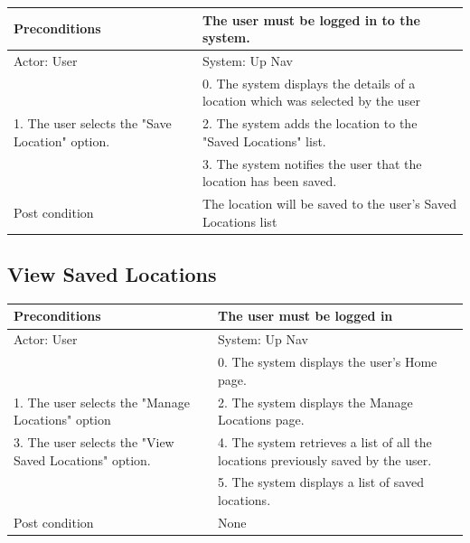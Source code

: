 \documentclass{article}
\begin{document}
\begin{enumerate}
	\begin{tabular}{ | m{15em} | m{15em}| }
		\hline
		Preconditions                                    										& The user must be logged in to the system.  \\ 
		\hline
		Actor: User                                     										& System: Up Nav                                                                  \\ 
		\hline
                                               													& 0. The system displays the details of a location which was selected by the user \\
		\hline
		1. The user selects the "Save Location" option. 								& 2. The system adds the location to the "Saved Locations" list. \\
		\hline
                                                													& 3. The system notifies the user that the location has been saved. \\
		\hline
		Post condition                                   										& The location will be saved to the user's Saved Locations list \\
		\hline
	\end{tabular}
	
	\subsection{View Saved Locations}

	\centering

	\begin{tabular}{ | m{15em} | m{15em}| }
		\hline
		Preconditions                                          										& The user must be logged in \\ 
		\hline
		Actor: User                                            										& System: Up Nav \\
		\hline
                                                       												& 0. The system displays the user's Home page. \\ 
		\hline
		1. The user selects the "Manage Locations" option								& 2. The system displays the Manage Locations page. \\
		\hline
		3. The user selects the "View Saved Locations" option.							& 4. The system retrieves a list of all the locations previously saved by the user. \\ 
		\hline
                                                      												& 5. The system displays a list of saved locations. \\
		\hline
		Post condition                                         		 								& None                                                                              \\
		\hline
	\end{tabular}



\end{enumerate}
\end{document}
